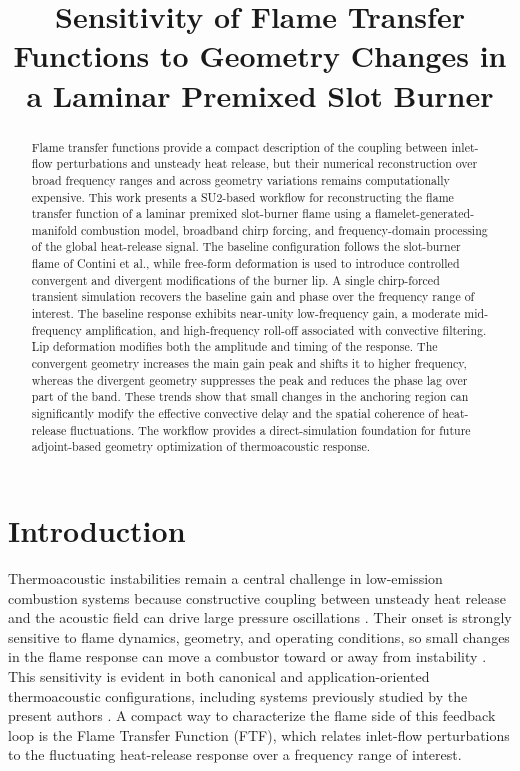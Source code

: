 \documentclass{iopconfser}
\begin{document}
\title{Sensitivity of Flame Transfer Functions to Geometry Changes in a Laminar Premixed Slot Burner}
\author{}

\begin{abstract}
Flame transfer functions provide a compact description of the coupling between inlet-flow perturbations and unsteady heat release, but their numerical reconstruction over broad frequency ranges and across geometry variations remains computationally expensive. This work presents a SU2-based workflow for reconstructing the flame transfer function of a laminar premixed slot-burner flame using a flamelet-generated-manifold combustion model, broadband chirp forcing, and frequency-domain processing of the global heat-release signal. The baseline configuration follows the slot-burner flame of Contini et al., while free-form deformation is used to introduce controlled convergent and divergent modifications of the burner lip. A single chirp-forced transient simulation recovers the baseline gain and phase over the frequency range of interest. The baseline response exhibits near-unity low-frequency gain, a moderate mid-frequency amplification, and high-frequency roll-off associated with convective filtering. Lip deformation modifies both the amplitude and timing of the response. The convergent geometry increases the main gain peak and shifts it to higher frequency, whereas the divergent geometry suppresses the peak and reduces the phase lag over part of the band. These trends show that small changes in the anchoring region can significantly modify the effective convective delay and the spatial coherence of heat-release fluctuations. The workflow provides a direct-simulation foundation for future adjoint-based geometry optimization of thermoacoustic response.
\end{abstract}

\section{Introduction}
\label{sec:introduction}

Thermoacoustic instabilities remain a central challenge in low-emission combustion systems because constructive coupling between unsteady heat release and the acoustic field can drive large pressure oscillations \cite{lieuwen2012unsteady,poinsot2005theoretical,poinsot2017prediction}. Their onset is strongly sensitive to flame dynamics, geometry, and operating conditions, so small changes in the flame response can move a combustor toward or away from instability \cite{mongia2003challenges}. This sensitivity is evident in both canonical and application-oriented thermoacoustic configurations, including systems previously studied by the present authors \cite{Giannotta2022,abbot2021thermoacoustic}. A compact way to characterize the flame side of this feedback loop is the Flame Transfer Function (FTF), which relates inlet-flow perturbations to the fluctuating heat-release response over a frequency range of interest.
\end{document}
